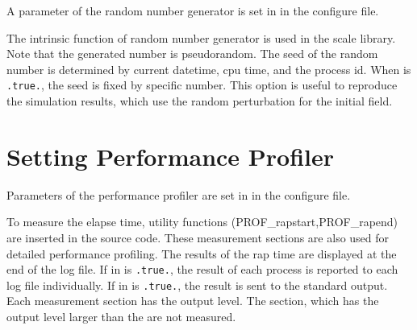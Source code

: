 {{A parameter of the random number generator is set in  in the configure file.


\noindent
The intrinsic function of random number generator is used in the scale library. Note that the generated number is pseudorandom.
The seed of the random number is determined by current datetime, cpu time, and the process id.
%
When  is \verb|.true.|, the seed is fixed by specific number.
This option is useful to reproduce the simulation results, which use the random perturbation for the initial field.



\section{Setting Performance Profiler} \label{subsec:prof}

Parameters of the performance profiler are set in  in the configure file.


\noindent
To measure the elapse time, utility functions (PROF\_rapstart,PROF\_rapend) are inserted in the source code.
These measurement sections are also used for detailed performance profiling.
%
The results of the rap time are displayed at the end of the log file.
If  in   is \verb|.true.|, the result of each process is reported to each log file individually.
If  in  is \verb|.true.|, the result is sent to the standard output.
%
Each measurement section has the output level. The section, which has the output level larger than the  are not measured.

}}
